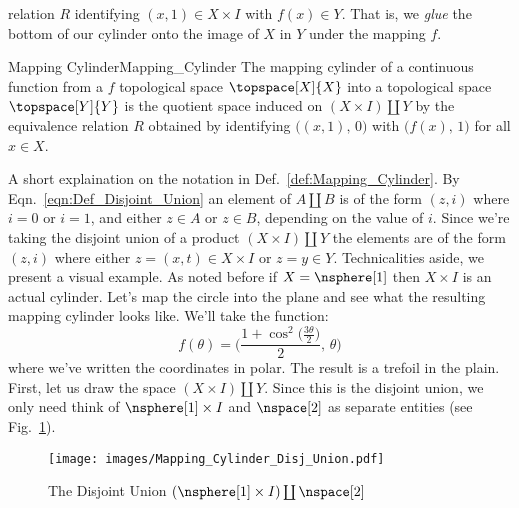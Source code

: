 \documentclass[oneside]{book}                                                  %
\begin{document}
                relation $R$ identifying $(x,1)\in{X}\times{I}$ with
                $f(x)\in{Y}$. That is, we \textit{glue} the bottom of our
                cylinder onto the image of $X$ in $Y$ under the mapping $f$.
                \begin{fdefinition}{Mapping Cylinder}{Mapping_Cylinder}
                    The mapping cylinder of a continuous function from a
                    $f$ topological space $\topspace[X]{X}$ into a topological
                    space $\topspace[Y]{Y}$ is the quotient space induced on
                    $(X\times{I})\coprod{Y}$ by the equivalence relation
                    $R$ obtained by identifying $\big((x,1),\,0\big)$ with
                    $\big(f(x),\,1\big)$ for all $x\in{X}$.
                \end{fdefinition}
                A short explaination on the notation in
                Def.~\ref{def:Mapping_Cylinder}. By
                Eqn.~\ref{eqn:Def_Disjoint_Union} an element of $A\coprod{B}$ is
                of the form $(z,i)$ where $i=0$ or $i=1$, and either $z\in{A}$
                or $z\in{B}$, depending on the value of $i$. Since we're taking
                the disjoint union of a product $(X\times{I})\coprod{Y}$ the
                elements are of the form $(z,i)$ where either
                $z=(x,t)\in{X}\times{I}$ or $z=y\in{Y}$. Technicalities aside,
                we present a visual example. As noted before if $X=\nsphere[1]$
                then $X\times{I}$ is an actual cylinder. Let's map the circle
                into the plane and see what the resulting mapping cylinder looks
                like. We'll take the function:
                \begin{equation}
                    \label{eqn:Trefoil_Mapping_Cylinder}%
                    f(\theta)=\Big(
                        \frac{1+\cos^{2}\big(\frac{3\theta}{2}\big)}{2},\,
                        \theta
                    \Big)
                \end{equation}
                where we've written the coordinates in polar. The result is a
                trefoil in the plain. First, let us draw the space
                $(X\times{I})\coprod{Y}$. Since this is the disjoint union, we
                only need think of $\nsphere[1]\times{I}$ and $\nspace[2]$ as
                separate entities
                (see Fig.~\ref{fig:Ex_Mapping_Cylinder_Disj_Union}).
                \begin{figure}[H]
                    \centering
                    \captionsetup{type=figure}
                    \texttt{[image: images/Mapping\_Cylinder\_Disj\_Union.pdf]}
                    \caption{The Disjoint Union
                             $(\nsphere[1]\times{I})\coprod\nspace[2]$}
                    \label{fig:Ex_Mapping_Cylinder_Disj_Union}
                \end{figure}
\end{document}
